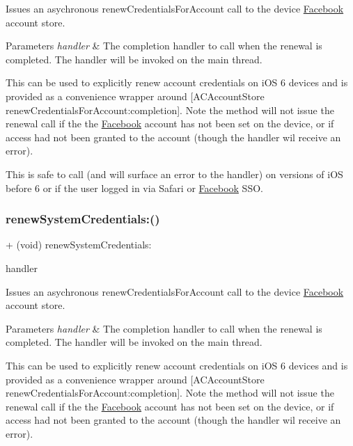 Issues an asychronous renew\+Credentials\+For\+Account call to the device \hyperlink{interfaceFacebook}{Facebook} account store.


\begin{DoxyParams}{Parameters}
{\em handler} & The completion handler to call when the renewal is completed. The handler will be invoked on the main thread.\\
\hline
\end{DoxyParams}
This can be used to explicitly renew account credentials on i\+OS 6 devices and is provided as a convenience wrapper around {\ttfamily \mbox{[}A\+C\+Account\+Store renew\+Credentials\+For\+Account\+:completion\mbox{]}}. Note the method will not issue the renewal call if the the \hyperlink{interfaceFacebook}{Facebook} account has not been set on the device, or if access had not been granted to the account (though the handler wil receive an error).

This is safe to call (and will surface an error to the handler) on versions of i\+OS before 6 or if the user logged in via Safari or \hyperlink{interfaceFacebook}{Facebook} S\+SO. \mbox{\label{interfaceFBSession_a3b4d7c16af36ea5690d19bf77065dfaf}} 
\subsubsection{\texorpdfstring{renew\+System\+Credentials\+:()}{renewSystemCredentials:()}\hspace{0.1cm}{\footnotesize\ttfamily [3/5]}}
{\footnotesize\ttfamily + (void) renew\+System\+Credentials\+: \begin{DoxyParamCaption}\item[{(F\+B\+Session\+Renew\+System\+Credentials\+Handler)}]{handler }\end{DoxyParamCaption}}

Issues an asychronous renew\+Credentials\+For\+Account call to the device \hyperlink{interfaceFacebook}{Facebook} account store.


\begin{DoxyParams}{Parameters}
{\em handler} & The completion handler to call when the renewal is completed. The handler will be invoked on the main thread.\\
\hline
\end{DoxyParams}
This can be used to explicitly renew account credentials on i\+OS 6 devices and is provided as a convenience wrapper around {\ttfamily \mbox{[}A\+C\+Account\+Store renew\+Credentials\+For\+Account\+:completion\mbox{]}}. Note the method will not issue the renewal call if the the \hyperlink{interfaceFacebook}{Facebook} account has not been set on the device, or if access had not been granted to the account (though the handler wil receive an error).

